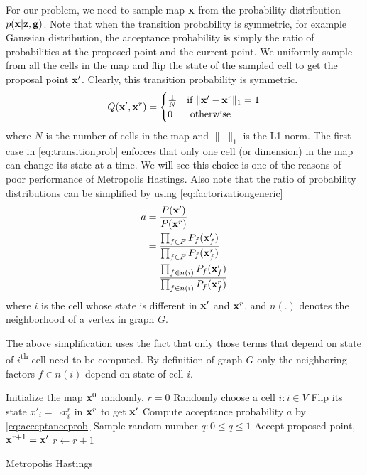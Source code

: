 \documentclass[letterpaper, 10 pt, conference]{ieeeconf} %
\begin{document}
For our problem, we need to sample map $\mathbf{x}$ from the probability
distribution $p(\mathbf{x}|\mathbf{z}, \mathbf{g})$. Note that when the transition probability
is symmetric, for example Gaussian distribution, the acceptance probability is
simply the ratio of probabilities at the proposed point and the current point.
We uniformly sample from all the cells in the map and flip the state of the
sampled cell to get the proposal point $\mathbf{x}'$. Clearly, this transition probability is symmetric.
\begin{align}
  Q(\mathbf{x}', \mathbf{x}^r) = \begin{cases}
    \frac{1}{N} & \text{if $\|\mathbf{x}' - \mathbf{x}^r\|_1 = 1$}\\
      0 & \text{ otherwise}
  \end{cases}
  \label{eq:transitionprob}
\end{align}
where $N$ is the number of cells in the map and $\|.\|_1$ is the L1-norm. The
first case in \eqref{eq:transitionprob} enforces that only one cell (or dimension)
in the map
can change its state at a time. We will see this choice is one of the reasons of
poor performance of Metropolis Hastings. Also note that the ratio of probability distributions can be simplified by using \eqref{eq:factorizationgeneric}
\begin{align}
  a &= \frac{P(\mathbf{x}')}{P(\mathbf{x}^r)}\\
    &= \frac{\prod_{f \in F} P_f(\mathbf{x}'_f)}{\prod_{f \in F} P_f(\mathbf{x}^r_f)}\\
    &= \frac{\prod_{f \in n(i)} P_f(\mathbf{x}'_f)}{\prod_{f \in n(i)} P_f(\mathbf{x}^r_f)}
  \label{eq:acceptanceprob}
\end{align}
where $i$ is the cell whose state is different in $\mathbf{x}'$ and $\mathbf{x}^r$,
and $n(.)$ denotes the neighborhood of a vertex in graph $G$.

The above simplification uses the fact that only those terms  that depend on
state of $i$\textsuperscript{th} cell need to be computed. By definition
of graph $G$ only the neighboring factors $f \in n(i)$ depend on state of cell $i$.

% 
\begin{algorithm}
  Initialize the map $\mathbf{x}^0$ randomly.\;
  $r = 0$\;
   {
    Randomly choose a cell $i : i \in V$\;
    Flip its state $x'_i = \neg x^r_i$ in $\mathbf{x}^r$ to get $\mathbf{x}'$\;
    Compute acceptance probability $a$ by \eqref{eq:acceptanceprob}\;
    Sample random number $q : 0 \le q \le 1$\;
     {
      Accept proposed point, $\mathbf{x}^{r + 1} = \mathbf{x}'$\;
    } 
    $r \leftarrow r + 1$\;
  }
  \caption{Metropolis Hastings}
\end{algorithm}
\end{document}
